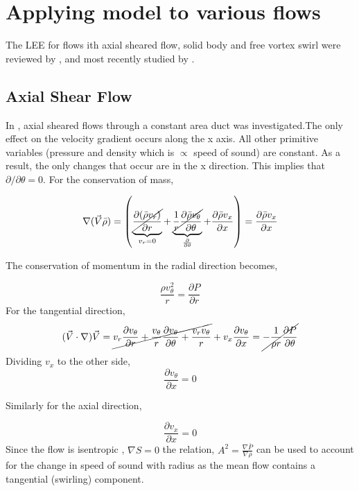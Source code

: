 \section{Applying model to various flows}
The LEE for flows ith axial sheared flow, solid body and free vortex swirl
were reviewed by \cite{kousen1995eigenmode}, and most recently studied by \cite{Maldonado2016}.
\subsection{Axial Shear Flow}
In \cite{kousen1995eigenmode}, axial sheared flows through a constant area duct was 
investigated.The only effect on the velocity gradient occurs along the x axis. 
All other primitive variables (pressure and density which is $\propto$ speed of
sound) are constant. As a result, the only changes that occur are in the x
direction. This implies that $\partial / \partial \theta = 0$. 
For the conservation of mass,

\[ \nabla (\vec{V}\bar{\rho}) =  \left( 
\underbrace{
	\cancel{
		\frac{\partial (\bar{\rho}v_r)	}{\partial r}
	}
}_{v_r = 0} +
\underbrace{\cancel{\frac{1}{r}	\frac{\partial \bar{\rho}v_{\theta}}{\partial \theta}}}_{\frac{\partial }{\partial \theta}} +
\frac{\partial \bar{\rho}v_x}{\partial x}
\right) = \frac{\partial \bar{\rho}v_x}{\partial x}\] 

The conservation of momentum in the radial direction becomes,

\[
\frac{{\rho} v_{\theta}^2}{r} 
=\frac{\partial P}{\partial r}
\]
For the tangential direction,
\[(\vec{V}\cdot \nabla) \vec{V} = \cancel{v_r \frac{\partial v_{\theta}}{\partial r} +
	\frac{v_{\theta}}{r}
	\frac{\partial v_{\theta}}{\partial \theta} +
	\frac{v_r v_{\theta}}{r}}+ 
v_x \frac{\partial v_{\theta}}{\partial x} 
= \cancel{-\frac{1}{\rho r} \frac{\partial P}{\partial \theta}}\]
Dividing $v_x$ to the other side,
\[ \frac{\partial v_{\theta}}{\partial x}  = 0\]

Similarly for the axial direction,

\[ \frac{\partial v_x}{\partial x} = 0 \]
Since the flow is isentropic , $\nabla S = 0$ the relation, $A^2= \frac{\nabla \bar{P}}{ \nabla \bar{\rho}}$ can be
used to account for the change in speed of sound with radius as the mean
flow contains a tangential (swirling) component.


